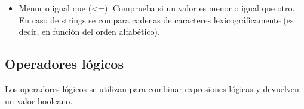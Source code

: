 \begin{itemize}
    \item Menor o igual que (<=): Comprueba si un valor es menor o igual que otro. En caso de strings se compara cadenas de caracteres lexicográficamente (es decir, en función del orden alfabético).
    \begin{figure}[h]
      \centering
    \end{figure}

  \end{itemize}

\subsection{Operadores lógicos}
Los operadores lógicos se utilizan para combinar expresiones lógicas y devuelven un valor booleano. 


